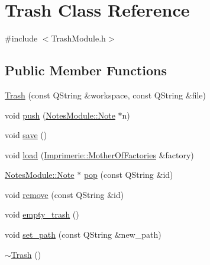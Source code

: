 \hypertarget{class_trash}{\section{Trash Class Reference}
\label{class_trash}
}


{\ttfamily \#include $<$Trash\-Module.\-h$>$}

\subsection*{Public Member Functions}
\begin{DoxyCompactItemize}
\item 
\hyperlink{class_trash_a7198a33637959516f781a5bbcb4005dd}{Trash} (const Q\-String \&workspace, const Q\-String \&file)
\item 
void \hyperlink{class_trash_ab319154280c2b387785dc4c749b89f26}{push} (\hyperlink{class_notes_module_1_1_note}{Notes\-Module\-::\-Note} $\ast$n)
\item 
void \hyperlink{class_trash_a86e6f4dcb21d9f15e4c3a65fe7d16144}{save} ()
\item 
void \hyperlink{class_trash_a4a86f48bed4d8f605c6b731375449bdd}{load} (\hyperlink{class_imprimerie_1_1_mother_of_factories}{Imprimerie\-::\-Mother\-Of\-Factories} \&factory)
\item 
\hyperlink{class_notes_module_1_1_note}{Notes\-Module\-::\-Note} $\ast$ \hyperlink{class_trash_a69c1c71631cfd72973aa054b649ce1c3}{pop} (const Q\-String \&id)
\item 
void \hyperlink{class_trash_a38e4f5562c801f0ee3c2c71e433b1cc6}{remove} (const Q\-String \&id)
\item 
void \hyperlink{class_trash_a7288f4ae8697d6117227956454f3e4f2}{empty\-\_\-trash} ()
\item 
void \hyperlink{class_trash_a5ca3e2afbd80ca4c7f723b0aff2b7bbb}{set\-\_\-path} (const Q\-String \&new\-\_\-path)
\item 
\hyperlink{class_trash_a60a7d414e03a3f62e8cbc0b66a640ad5}{$\sim$\-Trash} ()
\end{DoxyCompactItemize}


